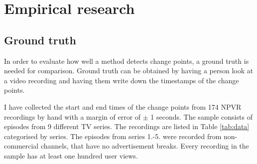 




\section{Empirical research} \label{sec:casestudy}

\subsection{Ground truth} \label{subsec:groundtruth} %

In order to evaluate how well a method detects change points, a ground truth is needed for comparison. Ground truth can be obtained by having a person look at a video recording and having them write down the timestamps of the change points.

I have collected the start and end times of the change points from 174 NPVR recordings by hand with a margin of error of $\pm$ 1 seconds. The sample consists of episodes from 9 different TV series. The recordings are listed in Table \ref{tab:data} categorised by series. The episodes from series 1.-5. were recorded from non-commercial channels, that have no advertisement breaks.
Every recording in the sample has at least one hundred user views.

